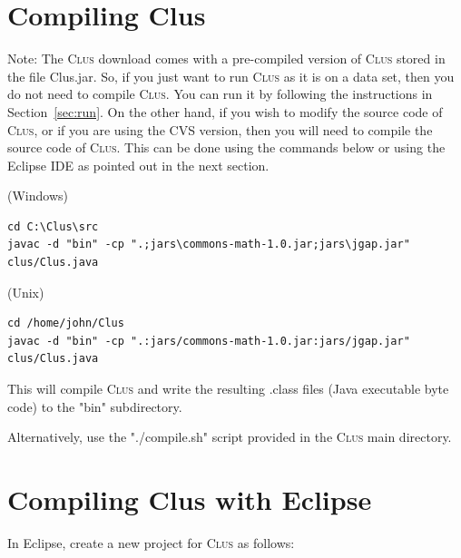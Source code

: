 \documentclass[a4paper]{report}
\newcommand{\clus}{\textsc{Clus}}
\begin{document}
\section{Compiling Clus}

Note: The \clus{} download comes with a pre-compiled version of \clus{} stored in the file Clus.jar. So, if you just want to run \clus{} as it is on a data set, then you do not need to compile \clus{}. You can run it by following the instructions in Section~\ref{sec:run}. On the other hand, if you wish to modify the source code of \clus{}, or if you are using the CVS version, then you will need to compile the source code of \clus{}. This can be done using the commands
below or using the Eclipse IDE as pointed out in the next section.

(Windows)

\begin{small}
\begin{verbatim}
cd C:\Clus\src
javac -d "bin" -cp ".;jars\commons-math-1.0.jar;jars\jgap.jar" clus/Clus.java
\end{verbatim}
\end{small}

(Unix)

\begin{small}
\begin{verbatim}
cd /home/john/Clus
javac -d "bin" -cp ".:jars/commons-math-1.0.jar:jars/jgap.jar" clus/Clus.java
\end{verbatim}
\end{small}

This will compile \clus{} and write the resulting .class files (Java executable 
byte code) to the "bin" subdirectory.

Alternatively, use the "./compile.sh" script provided in the \clus{} main directory.

\section{Compiling Clus with Eclipse}

In Eclipse, create a new project for \clus{} as follows:
\end{document}
